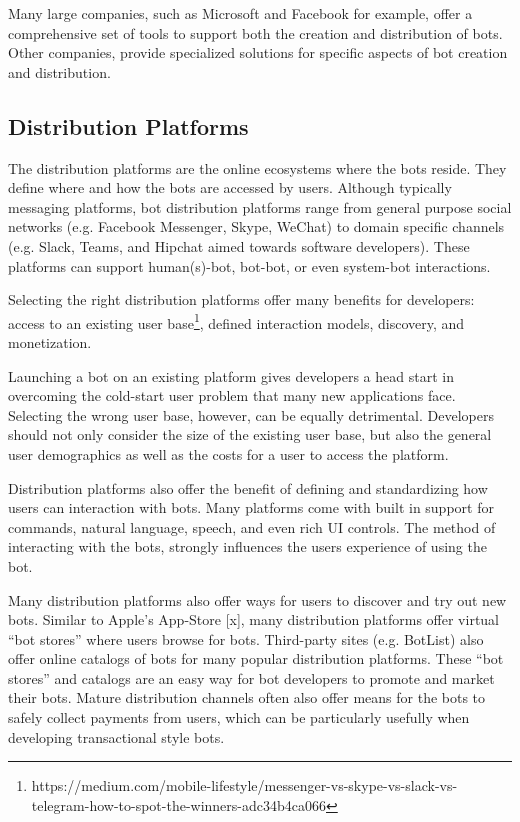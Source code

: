 \documentclass{sig-alternate}
\begin{document}
	Many large companies, such as Microsoft and Facebook for example, offer a comprehensive set of tools to support both the creation and distribution of bots. Other companies, provide specialized solutions for specific aspects of bot creation and distribution. 

	\subsection{Distribution Platforms}
	The distribution platforms are the online ecosystems where the bots reside. They define where and how the bots are accessed by users. Although typically messaging platforms, bot distribution platforms range from general purpose social networks (e.g. Facebook Messenger, Skype, WeChat) to domain specific channels (e.g. Slack, Teams, and Hipchat aimed towards software developers).  These platforms can support human(s)-bot, bot-bot, or even system-bot interactions.  

	Selecting the right distribution platforms offer many benefits for developers: access to an existing user base\footnote{https://medium.com/mobile-lifestyle/messenger-vs-skype-vs-slack-vs-telegram-how-to-spot-the-winners-adc34b4ca066\label{How_to_spot_the_winners}}, defined interaction models, discovery, and monetization.  

	Launching a bot on an existing platform gives developers a head start in overcoming the cold-start user problem that many new applications face. Selecting the wrong user base, however, can be equally detrimental. Developers should not only consider the size of the existing user base, but also the general user demographics as well as the costs for a user to access the platform. 

	Distribution platforms also offer the benefit of defining and standardizing how users can interaction with bots.  Many platforms come with built in support for commands, natural language, speech, and even rich UI controls.  The method of interacting with the bots, strongly influences the users experience of using the bot.

	Many distribution platforms also offer ways for users to discover and try out new bots. Similar to Apple's App-Store [x], many distribution platforms offer virtual ``bot stores'' where users browse for bots. Third-party sites (e.g. BotList) also offer online catalogs of bots for many popular distribution platforms. These ``bot stores'' and catalogs are an easy way for bot developers to promote and market their bots. Mature distribution channels often also offer means for the bots to safely collect payments from users, which can be particularly usefully when developing transactional style bots.
\end{document}

